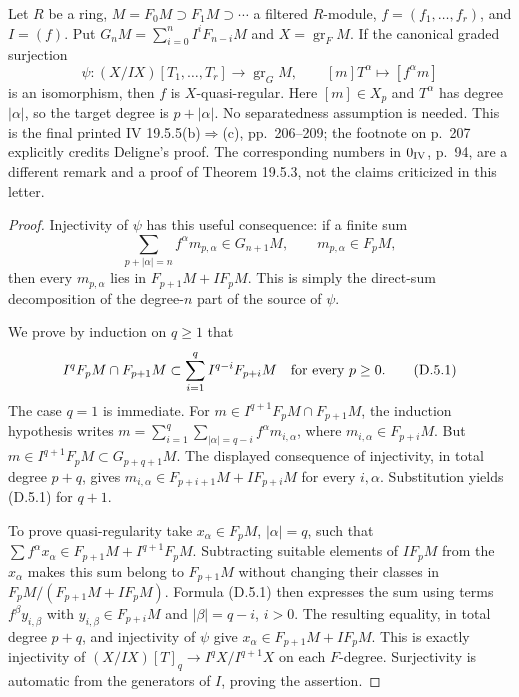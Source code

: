 \begin{proposition}\label{SA23-D-5}
Let $R$ be a ring, $M=F_0M\supset F_1M\supset\cdots$ a filtered
$R$-module, $f=(f_1,\ldots,f_r)$, and $I=(f)$.  Put
$G_nM=\sum_{i=0}^n I^iF_{n-i}M$ and $X=\operatorname{gr}_F M$.
If the canonical graded surjection
\[
 \psi:(X/IX)[T_1,\ldots,T_r]\longrightarrow
       \operatorname{gr}_G M,
 \qquad [m]T^\alpha\longmapsto[f^\alpha m]
\]
is an isomorphism, then $f$ is $X$-quasi-regular.  Here $[m]\in X_p$
and $T^\alpha$ has degree $|\alpha|$, so the target degree is
$p+|\alpha|$.  No separatedness assumption is needed.
This is the final printed IV 19.5.5(b)$\Rightarrow$(c), pp.~206--209;
the footnote on p.~207 explicitly credits Deligne's proof.  The
corresponding numbers in $0_{\rm IV}$, p.~94, are a different remark
and a proof of Theorem 19.5.3, not the claims criticized in this letter.
\end{proposition}
\begin{proof}
Injectivity of $\psi$ has this useful consequence: if a finite sum
\[
 \sum_{p+|\alpha|=n} f^\alpha m_{p,\alpha}\in G_{n+1}M,
 \qquad m_{p,\alpha}\in F_pM,
\]
then every $m_{p,\alpha}$ lies in $F_{p+1}M+IF_pM$.
This is simply the direct-sum decomposition of the degree-$n$
part of the source of $\psi$.

We prove by induction on $q\geq1$ that
\[
 I^qF_pM\cap F_{p+1}M
 \subset\sum_{i=1}^q I^{q-i}F_{p+i}M
 \quad\hbox{for every }p\geq0.                         \tag{D.5.1}
\]
The case $q=1$ is immediate.  For
$m\in I^{q+1}F_pM\cap F_{p+1}M$, the induction hypothesis writes
$m=\sum_{i=1}^q\sum_{|\alpha|=q-i}f^\alpha m_{i,\alpha}$,
where $m_{i,\alpha}\in F_{p+i}M$.  But
$m\in I^{q+1}F_pM\subset G_{p+q+1}M$.  The displayed consequence
of injectivity, in total degree $p+q$, gives
$m_{i,\alpha}\in F_{p+i+1}M+IF_{p+i}M$ for every $i,\alpha$.
Substitution yields (D.5.1) for $q+1$.

To prove quasi-regularity take $x_\alpha\in F_pM$, $|\alpha|=q$,
such that
$\sum f^\alpha x_\alpha\in F_{p+1}M+I^{q+1}F_pM$.
Subtracting suitable elements of $IF_pM$ from the $x_\alpha$
makes this sum belong to $F_{p+1}M$ without changing their classes
in $F_pM/(F_{p+1}M+IF_pM)$.  Formula (D.5.1) then expresses the
sum using terms $f^\beta y_{i,\beta}$ with
$y_{i,\beta}\in F_{p+i}M$ and $|\beta|=q-i$, $i>0$.
The resulting equality, in total degree $p+q$, and injectivity of
$\psi$ give $x_\alpha\in F_{p+1}M+IF_pM$.  This is exactly
injectivity of
$(X/IX)[T]_q\to I^qX/I^{q+1}X$ on each $F$-degree.  Surjectivity
is automatic from the generators of $I$, proving the assertion.
\end{proof}

